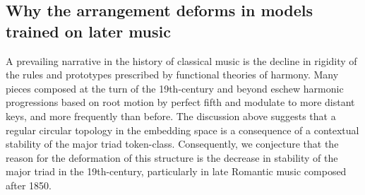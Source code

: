 \subsection{Why the arrangement deforms in models trained on later music}
A prevailing narrative in the history of classical music is the decline in rigidity of the rules and prototypes prescribed by functional theories of harmony. Many pieces composed at the turn of the 19th-century and beyond eschew harmonic progressions based on root motion by perfect fifth and modulate to more distant keys, and more frequently than before. 
The discussion above suggests that a regular circular topology in the embedding space is a consequence of a contextual stability of the major triad token-class. Consequently, we conjecture that the reason for the deformation of this structure is the decrease in stability of the major triad in the 19th-century, particularly in late Romantic music composed after 1850.